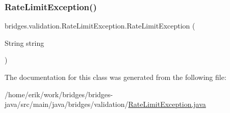 \subsubsection{\texorpdfstring{Rate\+Limit\+Exception()}{RateLimitException()}}
{\footnotesize\ttfamily bridges.\+validation.\+Rate\+Limit\+Exception.\+Rate\+Limit\+Exception (\begin{DoxyParamCaption}\item[{String}]{string }\end{DoxyParamCaption})}



The documentation for this class was generated from the following file\+:\begin{DoxyCompactItemize}
\item 
/home/erik/work/bridges/bridges-\/java/src/main/java/bridges/validation/\hyperlink{_rate_limit_exception_8java}{Rate\+Limit\+Exception.\+java}\end{DoxyCompactItemize}
